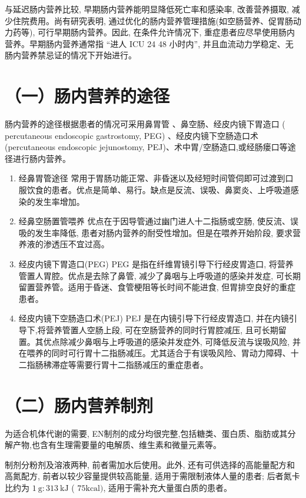 \documentclass[10pt]{article}
\begin{document}
与延迟肠内营养比较, 早期肠内营养能明显降低死亡率和感染率, 改善营养摄取, 减少住院费用。尚有研究表明, 通过优化的肠内营养管理措施(如空肠营养、促胃肠动力药等), 可行早期肠内营养。因此, 在条件允许情况下, 重症患者应尽早使用肠内营养。早期肠内营养通常指 “进人 ICU 24 48 小时内”, 并且血流动力学稳定、无肠内营养禁忌证的情况下开始进行。

\section*{（一）肠内营养的途径}
肠内营养的途径根据患者的情况可采用鼻胃管 、鼻空肠、经皮内镜下胃造口 ( percutaneous endoscopic gastrostomy, PEG) 、经皮内镜下空肠造口术 (percutaneous endoscopic jejunostomy, PEJ)、术中胃/空肠造口,或经肠瘘口等途径进行肠内营养。

\begin{enumerate}
  \item 经鼻胃管途径 常用于胃肠功能正常、非昏迷以及经短时间管伺即可过渡到口服饮食的患者。优点是简单、易行。缺点是反流、误吸、鼻窦炎、上呼吸道感染的发生率增加。

  \item 经鼻空肠置管喂养 优点在于因导管通过幽门进人十二指肠或空肠, 使反流、误吸的发生率降低, 患者对肠内营养的耐受性增加。但是在喂养开始阶段, 要求营养液的渗透压不宜过高。

  \item 经皮内镜下胃造口(PEG) PEG 是指在纤维胃镜引导下行经皮胃造口, 将营养管置人胃腔。优点是去除了鼻管, 减少了鼻咽与上呼吸道的感染并发症, 可长期留置营养管。适用于昏迷、食管梗阻等长时间不能进食, 但胃排空良好的重症患者。

  \item 经皮内镜下空肠造口术(PEJ) PEJ 是在内镜引导下行经皮胃造口, 并在内镜引导下,将营养管置人空肠上段, 可在空肠营养的同时行胃腔减压, 且可长期留置。其优点除减少鼻咽与上呼吸道的感染并发症外, 可降低反流与误吸风险, 并在喂养的同时可行胃十二指肠减压。尤其适合于有误吸风险、胃动力障碍、十二指肠䄶滞症等需要行胃十二指肠减压的重症患者。

\end{enumerate}

\section*{（二）肠内营养制剂}
为适合机体代谢的需要, EN制剂的成分均很完整,包括糖类、蛋白质、脂肪或其分解产物,也含有生理需要量的电解质、维生素和微量元素等。

制剂分粉剂及溶液两种, 前者需加水后使用。此外, 还有可供选择的高能量配方和高氮配方, 前者以较少容量提供较高能量, 适用于需限制液体人量的患者; 后者氮卡比约为 $1 \mathrm{~g}: 313 \mathrm{~kJ}$ ( $75 \mathrm{kcal})$, 适用于需补充大量蛋白质的患者。
\end{document}
